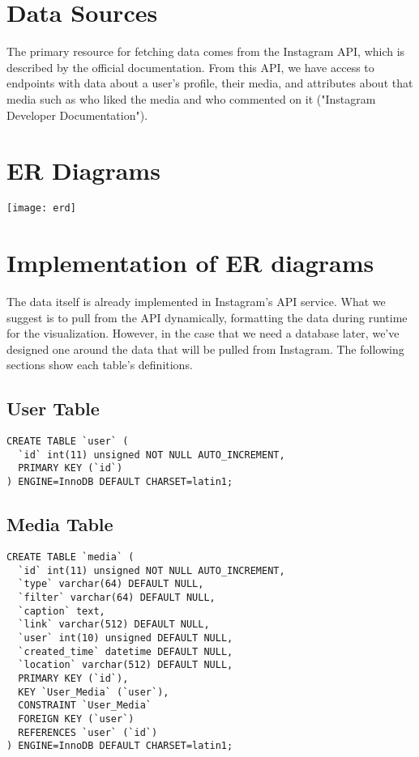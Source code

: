 \documentclass[journal]{vgtc}                %
\begin{document}
\section{Data Sources}
The primary resource for fetching data comes from the Instagram API, which is described by the official documentation. From this API, we have access to endpoints with data about a user's profile, their media, and attributes about that media such as who liked the media and who commented on it ("Instagram Developer Documentation").

\section{ER Diagrams}
\texttt{[image: erd]}

\section{Implementation of ER diagrams}
The data itself is already implemented in Instagram's API service. What we suggest is to pull from the API dynamically, formatting the data during runtime for the visualization. However, in the case that we need a database later, we've designed one around the data that will be pulled from Instagram. The following sections show each table's definitions.

\subsection{User Table}
\begin{verbatim}
CREATE TABLE `user` (
  `id` int(11) unsigned NOT NULL AUTO_INCREMENT,
  PRIMARY KEY (`id`)
) ENGINE=InnoDB DEFAULT CHARSET=latin1;
\end{verbatim}

\subsection{Media Table}
\begin{verbatim}
CREATE TABLE `media` (
  `id` int(11) unsigned NOT NULL AUTO_INCREMENT,
  `type` varchar(64) DEFAULT NULL,
  `filter` varchar(64) DEFAULT NULL,
  `caption` text,
  `link` varchar(512) DEFAULT NULL,
  `user` int(10) unsigned DEFAULT NULL,
  `created_time` datetime DEFAULT NULL,
  `location` varchar(512) DEFAULT NULL,
  PRIMARY KEY (`id`),
  KEY `User_Media` (`user`),
  CONSTRAINT `User_Media` 
  FOREIGN KEY (`user`)
  REFERENCES `user` (`id`)
) ENGINE=InnoDB DEFAULT CHARSET=latin1;
\end{verbatim}
\end{document}
